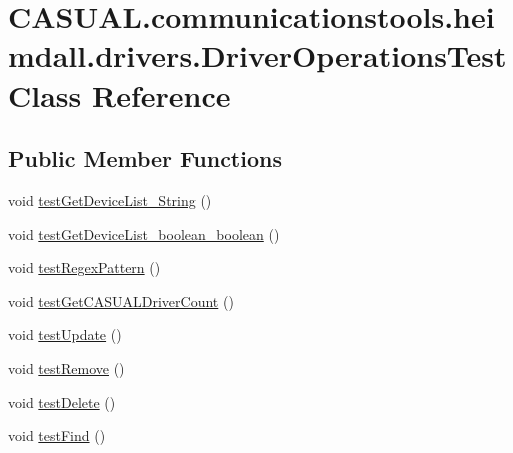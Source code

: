 \hypertarget{class_c_a_s_u_a_l_1_1communicationstools_1_1heimdall_1_1drivers_1_1_driver_operations_test}{\section{C\-A\-S\-U\-A\-L.\-communicationstools.\-heimdall.\-drivers.\-Driver\-Operations\-Test Class Reference}
\label{class_c_a_s_u_a_l_1_1communicationstools_1_1heimdall_1_1drivers_1_1_driver_operations_test}
}
\subsection*{Public Member Functions}
\begin{DoxyCompactItemize}
\item 
void \hyperlink{class_c_a_s_u_a_l_1_1communicationstools_1_1heimdall_1_1drivers_1_1_driver_operations_test_ac065acc83e4fe82ab992b79e25e5f97b}{test\-Get\-Device\-List\-\_\-\-String} ()
\item 
void \hyperlink{class_c_a_s_u_a_l_1_1communicationstools_1_1heimdall_1_1drivers_1_1_driver_operations_test_a36fc1e429fd4658fb4071ed84b9f291d}{test\-Get\-Device\-List\-\_\-boolean\-\_\-boolean} ()
\item 
void \hyperlink{class_c_a_s_u_a_l_1_1communicationstools_1_1heimdall_1_1drivers_1_1_driver_operations_test_a0dfeed938665700eecf1498420167622}{test\-Regex\-Pattern} ()
\item 
void \hyperlink{class_c_a_s_u_a_l_1_1communicationstools_1_1heimdall_1_1drivers_1_1_driver_operations_test_ab3003bfda57d6facc1296537657660f5}{test\-Get\-C\-A\-S\-U\-A\-L\-Driver\-Count} ()
\item 
void \hyperlink{class_c_a_s_u_a_l_1_1communicationstools_1_1heimdall_1_1drivers_1_1_driver_operations_test_a389a3075b6ec69b616fe05110cff6c5b}{test\-Update} ()
\item 
void \hyperlink{class_c_a_s_u_a_l_1_1communicationstools_1_1heimdall_1_1drivers_1_1_driver_operations_test_a8edd65233384964d8681dbe243efab59}{test\-Remove} ()
\item 
void \hyperlink{class_c_a_s_u_a_l_1_1communicationstools_1_1heimdall_1_1drivers_1_1_driver_operations_test_a770044da7eeb6873e7f239ff97af09db}{test\-Delete} ()
\item 
void \hyperlink{class_c_a_s_u_a_l_1_1communicationstools_1_1heimdall_1_1drivers_1_1_driver_operations_test_af04773e9a25ed70ef56e8298a07ecfd9}{test\-Find} ()

\end{DoxyCompactItemize}
